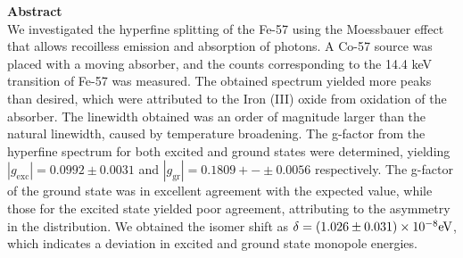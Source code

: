 \documentclass[a4paper]{report}
\numberwithin{equation}{section}
\begin{document}
\begin{titlepage}
	\vspace*{5em}

	\begin{minipage}{0.8\textwidth}
		\begin{centering}
			\textbf{Abstract}\\[0.2cm]
            We investigated the hyperfine splitting of the Fe-57 using the Moessbauer effect that allows 
            recoilless emission and absorption of photons. A Co-57 source was placed with a moving 
            absorber, and the counts corresponding to the 14.4 keV transition of Fe-57 was measured. The 
            obtained spectrum yielded more peaks than desired, which were attributed to the Iron (III) oxide
            from oxidation of the absorber. The linewidth obtained was an order of magnitude larger than the natural 
            linewidth, caused by temperature broadening. The g-factor from the hyperfine spectrum for both excited and ground 
            states were determined, yielding $| g_\mathrm{exc} | = 0.0992 \pm 0.0031$ and $| g_\mathrm{gr} | = 0.1809 +-\pm 0.0056$
            respectively. The g-factor of the ground state was in excellent agreement with the expected value, while those for the 
            excited state yielded poor agreement, attributing to the asymmetry in the distribution. We obtained the 
            isomer shift as $\delta = \num[scientific-notation=true]{0.1026(31)e-7}\si[]{\electronvolt}$, which indicates a deviation in 
            excited and ground state monopole energies. 
		\end{centering}
	\end{minipage}
	
	
	
	
	
	
	 
	
	
\end{titlepage}
\end{document}
